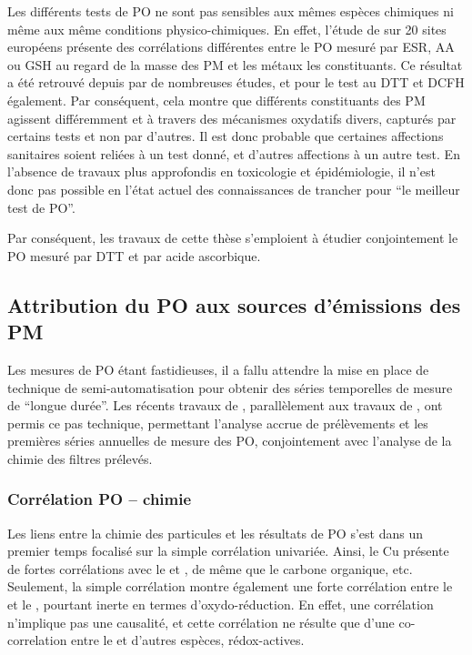 Les différents tests de PO ne sont pas sensibles aux mêmes espèces chimiques ni même aux même
conditions physico-chimiques. En effet, l'étude de \cite{kunzliComparison2006} sur 20
sites européens présente des corrélations différentes entre le PO mesuré par ESR, AA ou
GSH au regard de la masse des PM et les métaux les constituants.
Ce résultat a été retrouvé depuis par de nombreuses études, et pour le test au DTT et DCFH
également. Par conséquent, cela montre que différents constituants des PM agissent
différemment et à travers des mécanismes oxydatifs divers, capturés par certains tests et
non par d'autres.
Il est donc probable que certaines affections sanitaires soient reliées à un test donné, et
d'autres affections à un autre test. En l'absence de travaux plus approfondis en toxicologie
et épidémiologie, il n'est donc pas possible en l'état actuel des connaissances de trancher
pour ``le meilleur test de PO''.

Par conséquent, les travaux de cette thèse s'emploient à étudier conjointement le PO
mesuré par DTT et par acide ascorbique.


\subsection{Attribution du PO aux sources d'émissions des PM}%
\label{sub:attribution_du_po_aux_sources_d_émissions_des_pm}

Les mesures de PO étant fastidieuses, il a fallu attendre la mise en place de technique
de semi-automatisation pour obtenir des séries temporelles de mesure de ``longue durée''. Les récents
travaux de \cite{fangSemiautomated2015}, parallèlement aux travaux de
\cite{calasPollution2017}, ont permis ce pas technique, permettant l'analyse accrue de
prélèvements et les premières séries annuelles de mesure des PO, conjointement avec
l'analyse de la chimie des filtres prélevés.

\subsubsection{Corrélation PO -- chimie}%
\label{ssub:corrélation_po_chimie}

Les liens entre la chimie des particules et les résultats de PO s'est dans un premier temps focalisé
sur la simple corrélation univariée. Ainsi, le Cu présente de fortes corrélations
avec le \PODTT{} et \POAA, de même que le carbone organique, etc. Seulement, la simple
corrélation montre également une forte corrélation entre le \PODTT{} et le ,
pourtant inerte en termes d'oxydo-réduction.
En effet, une corrélation n'implique pas une causalité, et cette corrélation ne résulte
que d'une co-correlation entre le  et d'autres espèces, rédox-actives.

